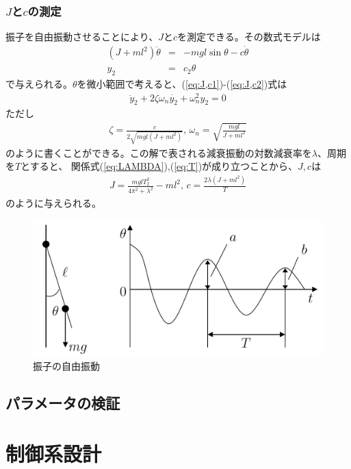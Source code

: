 \documentclass[a4j,11pt,twoside]{ujbook}
\begin{document}
\subsection{$J$と$c$の測定}
振子を自由振動させることにより、$J$と$c$を測定できる。その数式モデルは
\begin{eqnarray}
(J+ml^2)\ddot{\theta} & = & -mgl\sin{\theta} - c\dot{\theta}
\label{eq:J,c1}\\
y_2 & = & c_2\theta
\label{eq:J,c2}
\end{eqnarray}
で与えられる。$\theta$を微小範囲で考えると、(\ref{eq:J,c1})-(\ref{eq:J,c2})式は
\begin{eqnarray}
	\ddot{y}_2 + 2\zeta\omega_n\dot{y_2} + \omega_n^2y_2 = 0
\end{eqnarray}
ただし
\begin{eqnarray}
	\zeta = \frac{c}{2\sqrt{mgl(J + ml^2)}},\,
	\omega_n = \sqrt{\frac{mgl}{J + ml^2}}
\end{eqnarray}
のように書くことができる。この解で表される減衰振動の対数減衰率を$\lambda$、周期を$T$とすると、
関係式(\ref{eq:LAMBDA}),(\ref{eq:T})が成り立つことから、$J,c$は
\begin{eqnarray}
J = \frac{mglT_2^2}{4\pi^2 + \lambda^2} - ml^2 ,\, c = \frac{2\lambda(J +
	ml^2)}{T}
\end{eqnarray}
のように与えられる。

\clearpage

\begin{figure}[htbp]
	\begin{center}
		\includegraphics[width = 0.7 \linewidth]{measure_jc.png}
		\caption{振子の自由振動}
		\label{fig:振子の自由振動}
	\end{center}
\end{figure}


\section{パラメータの検証}

\chapter{制御系設計}
\begin{figure}

\end{figure}
\end{document}
